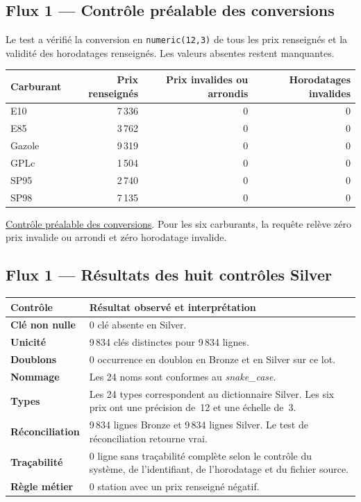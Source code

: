 \documentclass[11pt,a4paper]{article}
\newcommand{\code}[1]{\texttt{#1}}
\newcommand{\preuve}[2]{%
  \href{https://github.com/MAHDIghr/projet_big_data_starter/blob/27cc8348f6737a75bb24a40d6d8cda3ae54996b3/preuves/#1}{\textcolor{encre}{\underline{#2}}}}
\begin{document}
\subsection{Flux 1 --- Contrôle préalable des conversions}

Le test a vérifié la conversion en \code{numeric(12,3)} de tous
les prix renseignés et la validité des horodatages renseignés.
Les valeurs absentes restent manquantes.

{\small
\begin{tabularx}{\linewidth}{@{}Xrrr@{}}
\toprule
Carburant & Prix renseignés & Prix invalides ou arrondis &
Horodatages invalides \\
\midrule
E10    & 7\,336 & 0 & 0 \\
E85    & 3\,762 & 0 & 0 \\
Gazole & 9\,319 & 0 & 0 \\
GPLc   & 1\,504 & 0 & 0 \\
SP95   & 2\,740 & 0 & 0 \\
SP98   & 7\,135 & 0 & 0 \\
\bottomrule
\end{tabularx}
}

\preuve{api/api_10_carburants_conversions.png}{Contrôle préalable des conversions}. Pour les six carburants,
la requête relève zéro prix invalide ou arrondi et zéro horodatage invalide.

\subsection{Flux 1 --- Résultats des huit contrôles Silver}

{\small
\begin{tabularx}{\linewidth}{@{}>{\bfseries}p{3cm}X@{}}
\toprule
Contrôle & Résultat observé et interprétation \\
\midrule
Clé non nulle & 0 clé absente en Silver. \\
Unicité & 9\,834 clés distinctes pour 9\,834 lignes. \\
Doublons & 0 occurrence en doublon en Bronze et en Silver sur ce lot. \\
Nommage & Les 24 noms sont conformes au \emph{snake\_case}. \\
Types & Les 24 types correspondent au dictionnaire Silver.
Les six prix ont une précision de~12 et une échelle de~3. \\
Réconciliation & 9\,834 lignes Bronze et 9\,834 lignes Silver.
Le test de réconciliation retourne vrai. \\
Traçabilité & 0 ligne sans traçabilité complète selon le contrôle
du système, de l'identifiant, de l'horodatage et du fichier source. \\
Règle métier & 0 station avec un prix renseigné négatif. \\
\bottomrule
\end{tabularx}
}
\end{document}
